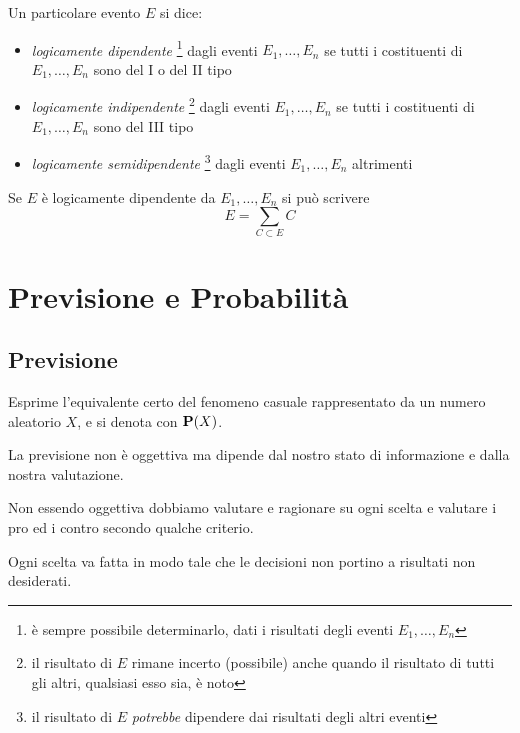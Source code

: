 \begin{definition}
  Un particolare evento $E$ si dice:
  \begin{itemize}
  \item \emph{logicamente dipendente}
  \footnote{è sempre possibile determinarlo, dati i risultati degli eventi \( E_1, \ldots, E_n \)}
  dagli eventi \( E_1, \ldots, E_n \) se tutti i costituenti di \( E_1, \ldots, E_n \) sono del I o del II tipo
  \item \emph{logicamente indipendente}
  \footnote{il risultato di $E$ rimane incerto (possibile) anche quando il risultato di tutti gli altri, qualsiasi esso sia, è noto}
  dagli eventi \( E_1, \ldots, E_n \) se tutti i costituenti di \( E_1, \ldots, E_n \) sono del III tipo
  \item \emph{logicamente semidipendente}
  \footnote{il risultato di $E$ \emph{potrebbe} dipendere dai risultati degli altri eventi}
  dagli eventi \( E_1, \ldots, E_n \) altrimenti
  \end{itemize}
\end{definition}

Se $E$ è logicamente dipendente da \( E_1, \ldots, E_n \) si può scrivere
\[ E = \sum_{C \subset E} C \]


\section{Previsione e Probabilità} %
\subsection{Previsione} %
\begin{definition}[Previsione]
  Esprime l'equivalente certo del fenomeno casuale rappresentato da un numero aleatorio $X$, e si denota con $\mathbf{P}(X)$.

  La previsione non è oggettiva ma dipende dal nostro stato di informazione e dalla nostra valutazione.
\end{definition}

Non essendo oggettiva dobbiamo valutare e ragionare su ogni scelta e valutare i pro ed i contro secondo qualche criterio.

\begin{definition}[Coerenza]\label{def:coerenza}
  Ogni scelta va fatta in modo tale che le decisioni non portino a risultati non desiderati.
\end{definition}

